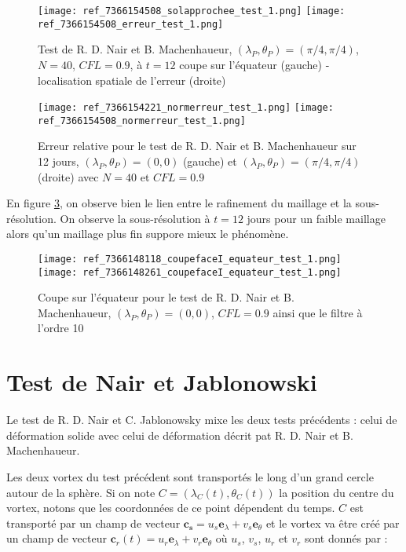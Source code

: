 \begin{figure}[ht]
\begin{center}
\texttt{[image: ref\_7366154508\_solapprochee\_test\_1.png]}
\texttt{[image: ref\_7366154508\_erreur\_test\_1.png]}
\caption{Test de R. D. Nair et B. Machenhaueur, $(\lambda_P, \theta_P) = (\pi/4,\pi/4)$, $N=40$, $CFL=0.9$, à $t=12$ coupe sur l'équateur (gauche) - localisation spatiale de l'erreur (droite)}
\label{fig NM2}
\end{center}
\end{figure}

\begin{figure}[ht]
\begin{center}
\texttt{[image: ref\_7366154221\_normerreur\_test\_1.png]}
\texttt{[image: ref\_7366154508\_normerreur\_test\_1.png]}
\caption{Erreur relative pour le test de R. D. Nair et B. Machenhaueur sur 12 jours,  $(\lambda_P, \theta_P) = (0,0)$ (gauche) et $(\lambda_P, \theta_P) = (\pi/4,\pi/4)$ (droite) avec $N=40$ et $CFL=0.9$}
\label{fig NM3}
\end{center}
\end{figure}

En figure \ref{fig NM4}, on observe bien le lien entre le rafinement du maillage et la sous-résolution. On observe la sous-résolution à $t=12$ jours pour un faible maillage alors qu'un maillage plus fin suppore mieux le phénomène.

\begin{figure}[ht]
\begin{center}
\texttt{[image: ref\_7366148118\_coupefaceI\_equateur\_test\_1.png]}
\texttt{[image: ref\_7366148261\_coupefaceI\_equateur\_test\_1.png]}
\caption{Coupe sur l'équateur pour le test de R. D. Nair et B. Machenhaueur, $(\lambda_P, \theta_P) = (0,0)$, $CFL=0.9$ ainsi que le filtre à l'ordre 10}
\label{fig NM4}
\end{center}
\end{figure}


\section{Test de Nair et Jablonowski}

Le test de R. D. Nair et C. Jablonowsky \cite{Nair2008} mixe les deux tests précédents : celui de déformation solide avec celui de déformation décrit pat R. D. Nair et B. Machenhaueur.

Les deux vortex du test précédent sont transportés le long d'un grand cercle autour de la sphère. Si on note $C=(\lambda_C(t), \theta_C(t))$ la position du centre du vortex, notons que les coordonnées de ce point dépendent du temps. $C$ est transporté par un champ de vecteur $\mathbf{c_s} = u_s \mathbf{e}_{\lambda} + v_s \mathbf{e}_{\theta}$ et le vortex va être créé par un champ de vecteur $\mathbf{c}_r(t)=u_r \mathbf{e}_{\lambda} + v_r \mathbf{e}_{\theta}$ où $u_s$, $v_s$, $u_r$ et $v_r$ sont donnés par :

